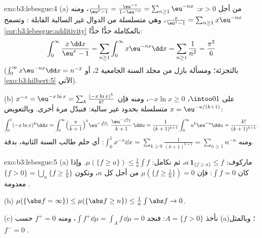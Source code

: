 \begin{solution}{exo:b3:lebesgue:4}
(a) من أجل $x > 0$: $\frac1{\eu^x - 1} = \frac{\eu^{-x}}{1 -
\eu^{-x}} = \sum_{n\geq1}\eu^{-nx}$، ومنه $\frac{x}{\eu^x - 1} =
\sum_{n\geq1}x\eu^{-nx}$، وهي متسلسلة من الدوال
غير السالبة القابلة : وتسمح \cref{cor:b3:lebesgue:additivity} بالمكاملة حدًّا
حدًّا:
\[
\int_0^\infty\frac{x\,\dd x}{\eu^x - 1}
= \sum_{n\geq1}\int_0^\infty x\eu^{-nx}\dd x
= \sum_{n\geq1}\frac1{n^2} = \frac{\pi^2}6
\]
($\int_0^\infty x\eu^{-nx}\dd x = n^{-2}$ بالتجزئة؛ ومسألة بازل من مجلد السنة الجامعية 2، أو
\cref{exo:b3:hilbert:5} الآتي).

(b) على $\intoo01$، $-x\ln x \geq 0$، ومنه فإن $x^{-x} =
\eu^{-x\ln x} = \sum_k\frac{(-x\ln x)^k}{k!}$ متسلسلة
بحدود غير سالبة: فنبدّل مرة أخرى. وبالتعويض $x =
\eu^{-u/(k+1)}$:
\[
\int_0^1(-x\ln x)^k\dd x
= \int_0^\infty\Bigl(\frac{u}{k+1}\Bigr)^{k}
\eu^{-\frac{ku}{k+1}}\;\frac{\eu^{-\frac u{k+1}}}{k+1}\,\dd u
= \frac{1}{(k+1)^{k+1}}\int_0^\infty u^k\eu^{-u}\dd u
= \frac{k!}{(k+1)^{k+1}} .
\]
ومنه $\int_0^1x^{-x}\dd x = \sum_{k\geq0}\frac{1}{(k+1)^{k+1}}
= \sum_{n\geq1}n^{-n}$: أي حلم طالب السنة الثانية، بدقة.
\end{solution}

\begin{solution}{exo:b3:lebesgue:5}
(a) ماركوف: $a\,\mathbf 1_{\{f \geq a\}} \leq f$، ثم نكامل: $\mu(\{f \geq a\}) \leq \frac1a\int f$. وإذا كان $\int f = 0$:
فإن $\mu(\{f \geq \frac1n\}) = 0$ من أجل كل $n$، وتكون $\{f > 0\} =
\bigcup_n\{f \geq \frac1n\}$ معدومة .

(b) $\mu(\{\abs f = \infty\}) \leq \mu(\{\abs f \geq n\}) \leq
\frac1n\int\abs f \to 0$.

(c) نأخذ $A = \{f > 0\}$: فنجد $\int f^+\dd\mu = \int_Af\,\dd\mu =
0$، ومنه $f^+ = 0$  حسب (a)؛ وبالمثل $f^- = 0$ .
\end{solution}

